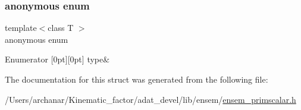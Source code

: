 \subsubsection{\texorpdfstring{anonymous enum}{anonymous enum}}
{\footnotesize\ttfamily template$<$class T $>$ \\
anonymous enum}

\begin{DoxyEnumFields}{Enumerator}
[0pt][0pt]{}\mbox{\label{structENSEM_1_1EnsbcIO_3_01PScalar_3_01T_01_4_01_4_ade348c43ef0a6a0df9afcee5dadba957adebfddcd965322a309c382c575cb6970}} 
type&\\
\hline

\end{DoxyEnumFields}


The documentation for this struct was generated from the following file\+:\begin{DoxyCompactItemize}
\item 
/\+Users/archanar/\+Kinematic\+\_\+factor/adat\+\_\+devel/lib/ensem/\mbox{\hyperlink{lib_2ensem_2ensem__primscalar_8h}{ensem\+\_\+primscalar.\+h}}\end{DoxyCompactItemize}
